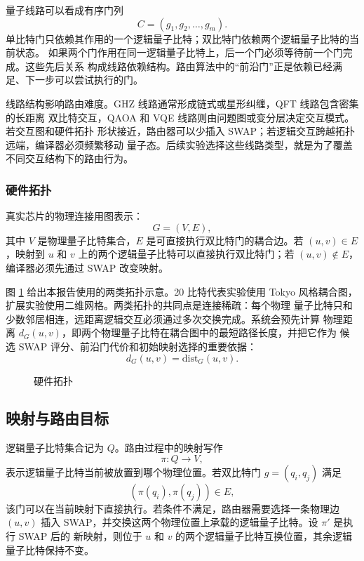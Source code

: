 量子线路可以看成有序门列
\[
  C=(g_1,g_2,\ldots,g_m).
\]
单比特门只依赖其作用的一个逻辑量子比特；双比特门依赖两个逻辑量子比特的当前状态。
如果两个门作用在同一逻辑量子比特上，后一个门必须等待前一个门完成。这些先后关系
构成线路依赖结构。路由算法中的“前沿门”正是依赖已经满足、下一步可以尝试执行的门。

线路结构影响路由难度。GHZ 线路通常形成链式或星形纠缠，QFT 线路包含密集的长距离
双比特交互，QAOA 和 VQE 线路则由问题图或变分层决定交互模式。若交互图和硬件拓扑
形状接近，路由器可以少插入 SWAP；若逻辑交互跨越拓扑远端，编译器必须频繁移动
量子态。后续实验选择这些线路类型，就是为了覆盖不同交互结构下的路由行为。

\subsubsection*{硬件拓扑}

真实芯片的物理连接用图表示：
\[
  G=(V,E),
\]
其中 $V$ 是物理量子比特集合，$E$ 是可直接执行双比特门的耦合边。若
$(u,v)\in E$，映射到 $u$ 和 $v$ 上的两个逻辑量子比特可以直接执行双比特门；若
$(u,v)\notin E$，编译器必须先通过 SWAP 改变映射。

图 \ref{fig:hardware-topology} 给出本报告使用的两类拓扑示意。20 比特代表实验使用
Tokyo 风格耦合图，扩展实验使用二维网格。两类拓扑的共同点是连接稀疏：每个物理
量子比特只和少数邻居相连，远距离逻辑交互必须通过多次交换完成。系统会预先计算
物理距离 $d_G(u,v)$，即两个物理量子比特在耦合图中的最短路径长度，并把它作为
候选 SWAP 评分、前沿门代价和初始映射选择的重要依据：
\[
  d_G(u,v)=\mathrm{dist}_G(u,v).
\]

\begin{figure}[H]
  \centering
  \resizebox{\linewidth}{!}{%
  
  }
  \caption{硬件拓扑}
  \label{fig:hardware-topology}
\end{figure}

\subsection{映射与路由目标}

逻辑量子比特集合记为 $Q$。路由过程中的映射写作
\[
  \pi:Q\rightarrow V ,
\]
表示逻辑量子比特当前被放置到哪个物理位置。若双比特门
$g=(q_i,q_j)$ 满足
\[
  (\pi(q_i),\pi(q_j))\in E,
\]
该门可以在当前映射下直接执行。若条件不满足，路由器需要选择一条物理边 $(u,v)$
插入 SWAP，并交换这两个物理位置上承载的逻辑量子比特。设 $\pi'$ 是执行 SWAP 后的
新映射，则位于 $u$ 和 $v$ 的两个逻辑量子比特互换位置，其余逻辑量子比特保持不变。

